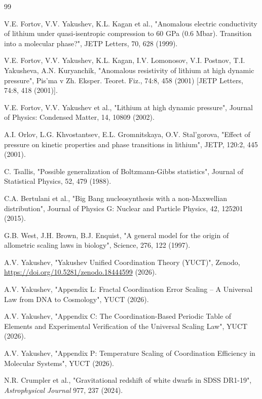 \documentclass[12pt,a4paper]{article}
\theoremstyle{remark}
\begin{document}
	\begin{thebibliography}{99}
		
		V.E. Fortov, V.V. Yakushev, K.L. Kagan et al., "Anomalous electric conductivity of lithium under quasi-isentropic compression to 60 GPa (0.6 Mbar). Transition into a molecular phase?", JETP Letters, 70, 628 (1999).
		
		V.E. Fortov, V.V. Yakushev, K.L. Kagan, I.V. Lomonosov, V.I. Postnov, T.I. Yakusheva, A.N. Kuryanchik, "Anomalous resistivity of lithium at high dynamic pressure", Pis'ma v Zh. Eksper. Teoret. Fiz., 74:8, 458 (2001) [JETP Letters, 74:8, 418 (2001)].
		
		V.E. Fortov, V.V. Yakushev et al., "Lithium at high dynamic pressure", Journal of Physics: Condensed Matter, 14, 10809 (2002).
		
		A.I. Orlov, L.G. Khvostantsev, E.L. Gromnitskaya, O.V. Stal'gorova, "Effect of pressure on kinetic properties and phase transitions in lithium", JETP, 120:2, 445 (2001).
		
		C. Tsallis, "Possible generalization of Boltzmann-Gibbs statistics", Journal of Statistical Physics, 52, 479 (1988).
		
		C.A. Bertulani et al., "Big Bang nucleosynthesis with a non-Maxwellian distribution", Journal of Physics G: Nuclear and Particle Physics, 42, 125201 (2015).
		
		G.B. West, J.H. Brown, B.J. Enquist, "A general model for the origin of allometric scaling laws in biology", Science, 276, 122 (1997).
		
		A.V. Yakushev, "Yakushev Unified Coordination Theory (YUCT)", Zenodo, \url{https://doi.org/10.5281/zenodo.18444599} (2026).
		
		A.V. Yakushev, "Appendix L: Fractal Coordination Error Scaling – A Universal Law from DNA to Cosmology", YUCT (2026).
		
		A.V. Yakushev, "Appendix C: The Coordination-Based Periodic Table of Elements and Experimental Verification of the Universal Scaling Law", YUCT (2026).
		
		A.V. Yakushev, "Appendix P: Temperature Scaling of Coordination Efficiency in Molecular Systems", YUCT (2026).
		
		N.R. Crumpler et al., "Gravitational redshift of white dwarfs in SDSS DR1-19", \emph{Astrophysical Journal} 977, 237 (2024).
		

\end{thebibliography}
\end{document}
